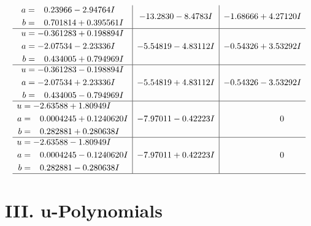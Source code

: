 \documentclass[1p]{elsarticle_modified}
\theoremstyle{definition}
\begin{document}
$$\begin{array}{c|c|c}
\begin{aligned}
a &= \phantom{-}0.23966 - 2.94764 I \\
b &= \phantom{-}0.701814 + 0.395561 I\end{aligned}
 & -13.2830 - 8.4783 I & -1.68666 + 4.27120 I \\ \hline\begin{aligned}
u &= -0.361283 + 0.198894 I \\
a &= -2.07534 - 2.23336 I \\
b &= \phantom{-}0.434005 + 0.794969 I\end{aligned}
 & -5.54819 - 4.83112 I & -0.54326 + 3.53292 I \\ \hline\begin{aligned}
u &= -0.361283 - 0.198894 I \\
a &= -2.07534 + 2.23336 I \\
b &= \phantom{-}0.434005 - 0.794969 I\end{aligned}
 & -5.54819 + 4.83112 I & -0.54326 - 3.53292 I \\ \hline\begin{aligned}
u &= -2.63588 + 1.80949 I \\
a &= \phantom{-}0.0004245 + 0.1240620 I \\
b &= \phantom{-}0.282881 + 0.280638 I\end{aligned}
 & -7.97011 - 0.42223 I & \phantom{-0.000000 } 0 \\ \hline\begin{aligned}
u &= -2.63588 - 1.80949 I \\
a &= \phantom{-}0.0004245 - 0.1240620 I \\
b &= \phantom{-}0.282881 - 0.280638 I\end{aligned}
 & -7.97011 + 0.42223 I & \phantom{-0.000000 } 0\\
 \hline 
 \end{array}$$\newpage
\newpage\renewcommand{\arraystretch}{1}
\centering \section*{ III. u-Polynomials}
\end{document}
